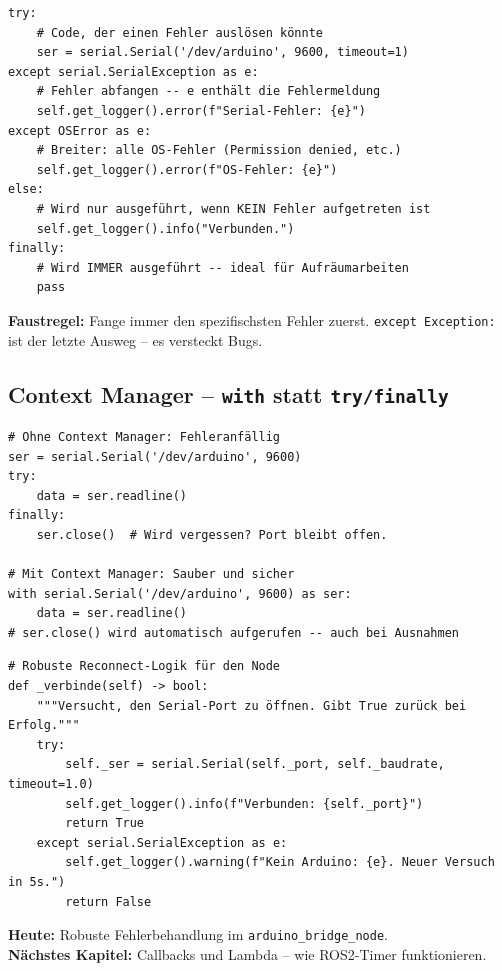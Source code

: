 \begin{wissenBox}
\begin{lstlisting}
try:
    # Code, der einen Fehler auslösen könnte
    ser = serial.Serial('/dev/arduino', 9600, timeout=1)
except serial.SerialException as e:
    # Fehler abfangen -- e enthält die Fehlermeldung
    self.get_logger().error(f"Serial-Fehler: {e}")
except OSError as e:
    # Breiter: alle OS-Fehler (Permission denied, etc.)
    self.get_logger().error(f"OS-Fehler: {e}")
else:
    # Wird nur ausgeführt, wenn KEIN Fehler aufgetreten ist
    self.get_logger().info("Verbunden.")
finally:
    # Wird IMMER ausgeführt -- ideal für Aufräumarbeiten
    pass
\end{lstlisting}

\textbf{Faustregel:} Fange immer den spezifischsten Fehler zuerst.
\texttt{except Exception:} ist der letzte Ausweg -- es versteckt Bugs.
\end{wissenBox}

\subsection{Context Manager -- \texttt{with} statt \texttt{try/finally}}

\begin{lstlisting}
# Ohne Context Manager: Fehleranfällig
ser = serial.Serial('/dev/arduino', 9600)
try:
    data = ser.readline()
finally:
    ser.close()  # Wird vergessen? Port bleibt offen.

# Mit Context Manager: Sauber und sicher
with serial.Serial('/dev/arduino', 9600) as ser:
    data = ser.readline()
# ser.close() wird automatisch aufgerufen -- auch bei Ausnahmen
\end{lstlisting}

\begin{lstlisting}
# Robuste Reconnect-Logik für den Node
def _verbinde(self) -> bool:
    """Versucht, den Serial-Port zu öffnen. Gibt True zurück bei Erfolg."""
    try:
        self._ser = serial.Serial(self._port, self._baudrate, timeout=1.0)
        self.get_logger().info(f"Verbunden: {self._port}")
        return True
    except serial.SerialException as e:
        self.get_logger().warning(f"Kein Arduino: {e}. Neuer Versuch in 5s.")
        return False
\end{lstlisting}

\begin{projektBox}
\textbf{Heute:} Robuste Fehlerbehandlung im \texttt{arduino\_bridge\_node}. \\
\textbf{Nächstes Kapitel:} Callbacks und Lambda -- wie ROS2-Timer funktionieren.
\end{projektBox}

